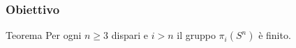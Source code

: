 \begin{frame}
\frametitle{Obiettivo}
\begin{block}{Teorema}
Per ogni \(n\ge 3\) dispari e \(i>n\) il gruppo \(\pi_i(S^n)\) è finito.
\end{block}
\end{frame}